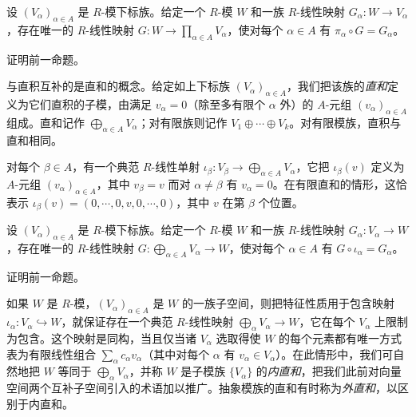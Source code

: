 \documentclass[../../main.tex]{subfiles}
\begin{document}
\begin{proposition}[直积的特征性质]\label{proposition:appB-direct-product-universal}
设 $(V_\alpha)_{\alpha\in A}$ 是 $R$-模下标族。给定一个 $R$-模 $W$ 和一族 $R$-线性映射 $G_\alpha:W\to V_\alpha$，存在唯一的 $R$-线性映射 $G:W\to\prod_{\alpha\in A}V_\alpha$，使对每个 $\alpha\in A$ 有 $\pi_\alpha\circ G=G_\alpha$。
\end{proposition}

\begin{exercise}\label{exercise:appB-B-54}
证明前一命题。
\end{exercise}

与直积互补的是直和的概念。给定如上下标族 $(V_\alpha)_{\alpha\in A}$，我们把该族的\emph{直和}定义为它们直积的子模，由满足 $v_\alpha=0$（除至多有限个 $\alpha$ 外）的 $A$-元组 $(v_\alpha)_{\alpha\in A}$ 组成。直和记作 $\bigoplus_{\alpha\in A}V_\alpha$；对有限族则记作 $V_1\oplus\cdots\oplus V_k$。对有限模族，直积与直和相同。

对每个 $\beta\in A$，有一个典范 $R$-线性单射 $\iota_\beta:V_\beta\to\bigoplus_{\alpha\in A}V_\alpha$，它把 $\iota_\beta(v)$ 定义为 $A$-元组 $(v_\alpha)_{\alpha\in A}$，其中 $v_\beta=v$ 而对 $\alpha\neq\beta$ 有 $v_\alpha=0$。在有限直和的情形，这恰表示 $\iota_\beta(v)=(0,\cdots ,0,v,0,\cdots ,0)$，其中 $v$ 在第 $\beta$ 个位置。

\begin{proposition}[直和的特征性质]\label{proposition:appB-direct-sum-universal}
设 $(V_\alpha)_{\alpha\in A}$ 是 $R$-模下标族。给定一个 $R$-模 $W$ 和一族 $R$-线性映射 $G_\alpha:V_\alpha\to W$，存在唯一的 $R$-线性映射 $G:\bigoplus_{\alpha\in A}V_\alpha\to W$，使对每个 $\alpha\in A$ 有 $G\circ\iota_\alpha=G_\alpha$。
\end{proposition}

\begin{exercise}\label{exercise:appB-B-56}
证明前一命题。
\end{exercise}

如果 $W$ 是 $R$-模，$(V_\alpha)_{\alpha\in A}$ 是 $W$ 的一族子空间，则把特征性质用于包含映射 $\iota_\alpha:V_\alpha\hookrightarrow W$，就保证存在一个典范 $R$-线性映射 $\bigoplus_\alpha V_\alpha\to W$，它在每个 $V_\alpha$ 上限制为包含。这个映射是同构，当且仅当诸 $V_\alpha$ 选取得使 $W$ 的每个元素都有唯一方式表为有限线性组合 $\sum_\alpha c_\alpha v_\alpha$（其中对每个 $\alpha$ 有 $v_\alpha\in V_\alpha$）。在此情形中，我们可自然地把 $W$ 等同于 $\bigoplus_\alpha V_\alpha$，并称 $W$ 是子模族 $\{V_\alpha\}$ 的\emph{内直和}，把我们此前对向量空间两个互补子空间引入的术语加以推广。抽象模族的直和有时称为\emph{外直和}，以区别于内直和。
\end{document}
